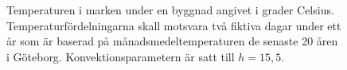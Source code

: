\begin{figure}
\centering
{}
\caption{\label{fig:groundheat}Temperaturen i marken under en byggnad angivet i grader Celsius.
Temperaturfördelningarna skall motsvara två fiktiva dagar under ett år som är baserad på månadsmedeltemperaturen
de senaste 20 åren i Göteborg. Konvektionsparametern är satt till $h=15,5$. }
\end{figure}


